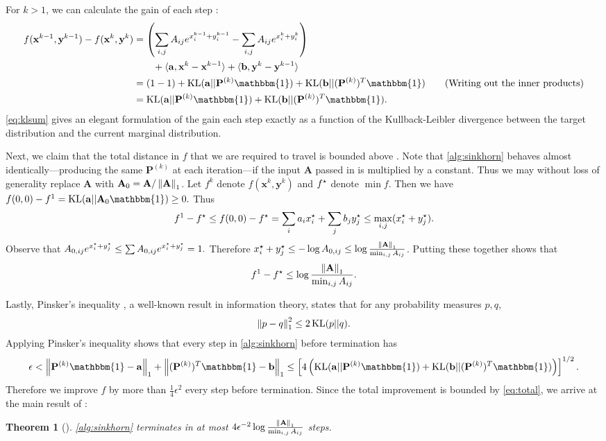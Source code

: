 \documentclass{article}
\newtheorem{theorem}{Theorem}
\renewcommand{\b}{\mathbf}
\newcommand{\one}{\mathbbm{1}}
\newcommand{\KL}{\operatorname{KL}}
\theoremstyle{definition}
\theoremstyle{remark}
\begin{document}
For $k > 1$, we can
 calculate the gain of each step \cite[Lemma 2]{altschuler2017near}:
\begin{align}
f(\b x^{k-1}, \b y^{k-1}) - f(\b x^{k}, \b y^{k}) &= \pr{\sum_{i,j} A_{ij}e^
{x_i^{k-1} + y_i^{k-1}} - \sum_{i,j} A_{ij}e^
{x_i^{k} + y_i^{k}}} \nonumber\\&\qquad+ \ip{\b a, \b x^k -\b x^{k-1}} + \ip{\b
 b,
 \b y^k - \b y^{k-1}}
 \nonumber\\
&= (1-1) + \KL(\b a || \b P^{(k)}\one) + \KL(\b b || (\b P^{(k)})^T\one)
 \nonumber \tag{Writing out the inner products}\\
&= \KL(\b a || \b P^{(k)}\one) + \KL(\b b || (\b P^{(k)})^T\one). 
\label{eq:klsum}
\end{align}
\eqref{eq:klsum} gives an elegant formulation of the gain each step exactly as a
 function of the Kullback-Leibler divergence between the target distribution and
 the current marginal distribution.

Next, we claim that the total distance in $f$ that we are required to
 travel is bounded above \cite[Lemma 3]{altschuler2017near}. Note that 
\cref{alg:sinkhorn} behaves almost identically---producing the same $\b P^{(k)}$
 at each iteration---if the input $\b A$ passed in is
 multiplied by a constant. Thus we may without loss of generality replace $\b A$
 with
 $\b A_0 = \b A / \norm{\b A}_1$. Let $f^k$ denote $f(\b x^k, \b y^k)$ and
 $f^\star$ denote $\min f$. Then we have $
f(0,0) - f^1 = \KL(\b a || \b A_0\one) \ge 0.
$
Thus \[
f^1 - f^\star \le f(0,0) - f^\star = \sum_{i} a_i x_i^\star + \sum_j b_j y_j^\star \le \max_
{i,j}
(x_i^\star + y_j^\star).
\]
Observe that $
A_{0, ij}e^{x_i^\star + y_j^\star} \le \sum  A_{0, ij}e^{x_i^\star + y_j^\star} = 1.
$
Therefore $x_i^\* + y_j^\* \le -\log A_{0,ij} \le \log \frac{\norm{\b A}_1}{\min_
{i,j} A_{ij}}$. Putting these together shows that \begin{equation}
\label{eq:total}
  f^1 - f^\* \le \log \frac{\norm{\b A}_1}{\min_
{i,j} A_{ij}}.
\end{equation}

Lastly, Pinsker's inequality \cite[Lemma 4]{altschuler2017near}, a well-known
 result in information theory, states that for any probability measures $p, q$,
 \[
\norm{p-q}_1^2 \le 2 \KL(p||q). 
\]
Applying Pinsker's inequality shows that every step in \cref{alg:sinkhorn}
 before termination has \[
\epsilon < \norm{\b P^{(k)}\one - \b a}_1 + \norm{(\b P^{(k)})^T\one - \b b}_1
 \le \bk{4\pr{\KL(\b a || \b P^{(k)}\one) + \KL(\b b || (\b P^{(k)})^T\one)}}^
{1/2}.
\]
Therefore we improve $f$ by more than $\frac{1}{4}\epsilon^2$ every step before
 termination. Since the total improvement is bounded by \eqref{eq:total}, we
 arrive at the main result of \cite{altschuler2017near}:
\begin{theorem}[\cite{altschuler2017near}]
\label{thm:sinkhorn_convergence}
  \cref{alg:sinkhorn} terminates in at most $4\epsilon^{-2}\log \frac{\norm{\b A}_1}{\min_
{i,j} A_{ij}}$ steps.
\end{theorem}
\end{document}
